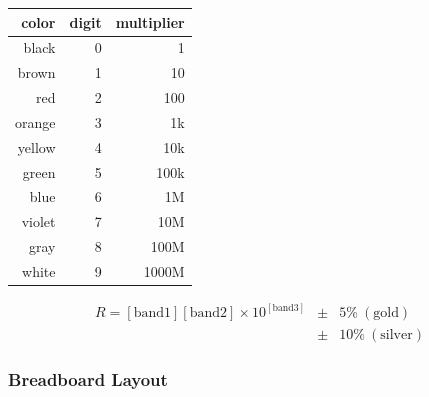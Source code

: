 \documentclass[11pt, twocolumn]{article}
\begin{document}
\begin{center}
\begin{tabular}{|r|r|r|}\hline
\textbf{color} & \textbf{digit} & \textbf{multiplier} \\\hline
\color{white}\cellcolor{Black}black & 0 & 1     \\\hline
\color{white}\cellcolor{Brown}brown & 1 & 10    \\\hline
\cellcolor{Red}red                  & 2 & 100   \\\hline
\cellcolor{Orange}orange            & 3 & 1k    \\\hline
\cellcolor{Yellow}yellow            & 4 & 10k   \\\hline
\cellcolor{Green}green              & 5 & 100k  \\\hline
\cellcolor{Blue}blue                & 6 & 1M    \\\hline
\cellcolor{Purple}violet            & 7 & 10M   \\\hline
\cellcolor{Gray}gray                & 8 & 100M  \\\hline
white                               & 9 & 1000M \\\hline
\end{tabular}
\begin{eqnarray*}
R = [\mathrm{band 1}][\mathrm{band 2}] 
    \times 10^{[\mathrm{band 3}]} & \pm & 5\%~(\mathrm{gold})\\ 
                                  & \pm & 10\%~(\mathrm{silver})\nonumber
\end{eqnarray*}
\end{center}

\subsubsection*{Breadboard Layout}
\begin{center}
\end{center}
\end{document}
